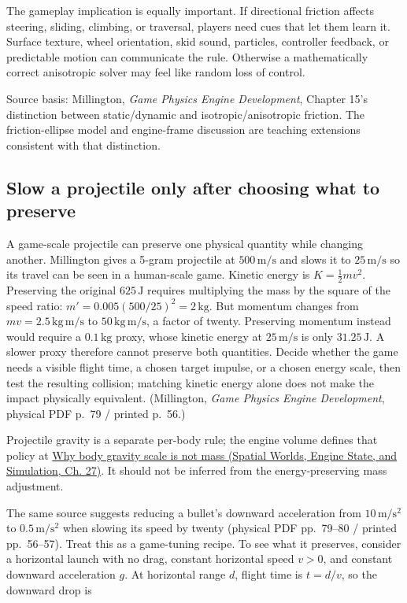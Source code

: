 The gameplay implication is equally important. If directional friction affects steering, sliding, climbing, or traversal, players need cues that let them learn it. Surface texture, wheel orientation, skid sound, particles, controller feedback, or predictable motion can communicate the rule. Otherwise a mathematically correct anisotropic solver may feel like random loss of control.

Source basis: Millington, \emph{Game Physics Engine Development}, Chapter 15's distinction between static/dynamic and isotropic/anisotropic friction. The friction-ellipse model and engine-frame discussion are teaching extensions consistent with that distinction.

\subsection{Slow a projectile only after choosing what to preserve}\label{06-engine-ii-ch047-slow-a-projectile-only-after-choosing-what-to-preserve}

A game-scale projectile can preserve one physical quantity while changing another. Millington gives a 5-gram projectile at \(500\,\mathrm{m/s}\) and slows it to \(25\,\mathrm{m/s}\) so its travel can be seen in a human-scale game. Kinetic energy is \(K=\tfrac12mv^2\). Preserving the original \(625\,\mathrm J\) requires multiplying the mass by the square of the speed ratio: \(m'=0.005(500/25)^2=2\,\mathrm{kg}\). But momentum changes from \(mv=2.5\,\mathrm{kg\,m/s}\) to \(50\,\mathrm{kg\,m/s}\), a factor of twenty. Preserving momentum instead would require a \(0.1\,\mathrm{kg}\) proxy, whose kinetic energy at \(25\,\mathrm{m/s}\) is only \(31.25\,\mathrm J\). A slower proxy therefore cannot preserve both quantities. Decide whether the game needs a visible flight time, a chosen target impulse, or a chosen energy scale, then test the resulting collision; matching kinetic energy alone does not make the impact physically equivalent. (Millington, \emph{Game Physics Engine Development}, physical PDF p.~79 / printed p.~56.)

Projectile gravity is a separate per-body rule; the engine volume defines that policy at \href{../05-Spatial-Worlds-Engine-State-and-Simulation/main.pdf\#nameddest=06-engine-ii-ch038-why-body-gravity-scale-is-not-mass}{Why body gravity scale is not mass (Spatial Worlds, Engine State, and Simulation, Ch. 27)}. It should not be inferred from the energy-preserving mass adjustment.

The same source suggests reducing a bullet's downward acceleration from \(10\,\mathrm{m/s^2}\) to \(0.5\,\mathrm{m/s^2}\) when slowing its speed by twenty (physical PDF pp.~79--80 / printed pp.~56--57). Treat this as a game-tuning recipe. To see what it preserves, consider a horizontal launch with no drag, constant horizontal speed \(v>0\), and constant downward acceleration \(g\). At horizontal range \(d\), flight time is \(t=d/v\), so the downward drop is

